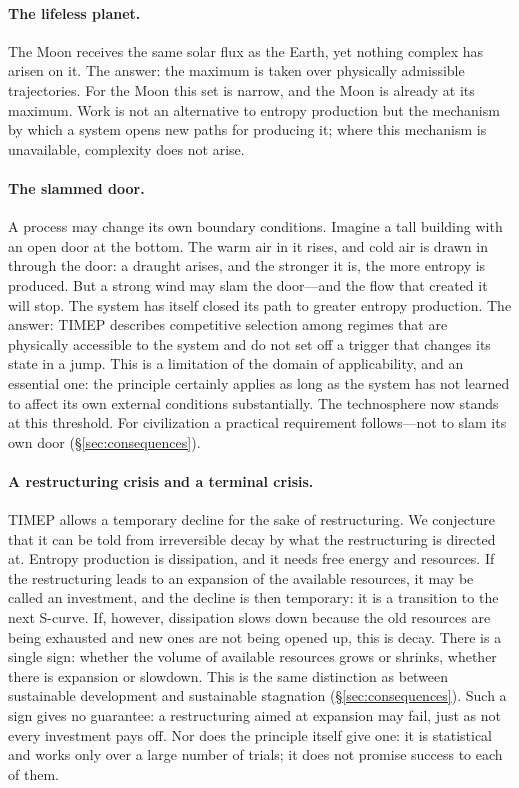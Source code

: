 \documentclass[11pt,a4paper]{article}
\newcommand{\Sref}[1]{\hyperref[#1]{\S\ref{#1}}}
\begin{document}
\paragraph{The lifeless planet.}
The Moon receives the same solar flux as the Earth, yet nothing complex has arisen on it. The answer: the maximum is taken over physically admissible trajectories. For the Moon this set is narrow, and the Moon is already at its maximum. Work is not an alternative to entropy production but the mechanism by which a system opens new paths for producing it; where this mechanism is unavailable, complexity does not arise.

\paragraph{The slammed door.}
A process may change its own boundary conditions. Imagine a tall building with an open door at the bottom. The warm air in it rises, and cold air is drawn in through the door: a draught arises, and the stronger it is, the more entropy is produced. But a strong wind may slam the door---and the flow that created it will stop. The system has itself closed its path to greater entropy production. The answer: TIMEP describes competitive selection among regimes that are physically accessible to the system and do not set off a trigger that changes its state in a jump. This is a limitation of the domain of applicability, and an essential one: the principle certainly applies as long as the system has not learned to affect its own external conditions substantially. The technosphere now stands at this threshold. For civilization a practical requirement follows---not to slam its own door (\Sref{sec:consequences}).

\paragraph{A restructuring crisis and a terminal crisis.}
TIMEP allows a temporary decline for the sake of restructuring. We conjecture that it can be told from irreversible decay by what the restructuring is directed at. Entropy production is dissipation, and it needs free energy and resources. If the restructuring leads to an expansion of the available resources, it may be called an investment, and the decline is then temporary: it is a transition to the next S-curve. If, however, dissipation slows down because the old resources are being exhausted and new ones are not being opened up, this is decay. There is a single sign: whether the volume of available resources grows or shrinks, whether there is expansion or slowdown. This is the same distinction as between sustainable development and sustainable stagnation (\Sref{sec:consequences}). Such a sign gives no guarantee: a restructuring aimed at expansion may fail, just as not every investment pays off. Nor does the principle itself give one: it is statistical and works only over a large number of trials; it does not promise success to each of them.
\end{document}
